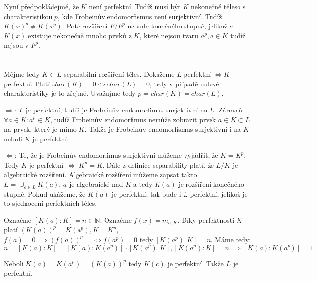 \documentclass[12pt, a4paper]{article}
\begin{document}
Nyní předpokládejmě, že $K$ není perfektní. Tudíž musí být $K$ nekonečné těleso s charakteristikou $p$, kde Frobeinův endomorfismus není surjektivní. Tudíž $K(x)^p \neq K(x^p)$. Poté rozšíření $F/F^p$ nebude konečného stupně, jelikož v $K(x)$ existuje nekonečně mnoho prvků z $K$, které nejsou tvaru $a^p, a \in K$ tudíž nejsou v $F^p$.

\section{}
Mějme tedy $K \subset L$ separabilní rozšíření těles. Dokážeme $L$ perfektní $\iff K$ perfektní. Platí $char(K) = 0 \iff char(L) = 0$, tedy v případě nulové charakteristiky je to zřejmé. Uvažujme tedy $p = char(K) = char(L)$.

$\Rightarrow$: $L$ je perfektní, tudíž je Frobeinův endomorfimus surjektivní na $L$. Zároveň $\forall a \in K: a^p \in K$, tudíž Frobeinův endomorfimus nemůže zobrazit prvek $a \in K \subset L$ na prvek, který je mimo $K$. Takže je Frobeinův endomorfismus surjektivní i na $K$ neboli $K$ je perfektní.

$\Leftarrow$: To, že je Frobeinův endomorfimus surjektivní můžeme vyjádřit, že $K = K^p$. Tedy $K$ je perfektní $\iff$ $K^p = K$. Dále z definice separability platí, že $L/K$ je algebraické rozšíření. Algebraické rozšíření můžeme zapsat takto $L = \cup_{a\in L} K(a)$. $a$ je algebraické nad $K$ a tedy $K(a)$ je rozšíření konečného stupně. Pokud ukážeme, že $K(a)$ je perfektní, tak bude i $L$ perfektní, jelikož je to sjednocení perfektních těles.

Označme $[K(a):K]=n \in \mathbb{N}$. Označme $f(x)=m_{a,K}$. Díky perfektnosti $K$ platí $(K(a))^p = K(a^p), K = K^p$, $f(a)=0 \implies (f(a))^p = \iff f(a^p)=0$ tedy $[K(a^p):K] = n$. Máme tedy:
\[
n=[K(a):K]=[K(a):K(a^p)]\cdot [K(a^p):K], [K(a^p):K] =n \implies [K(a):K(a^p)] = 1
\]

Neboli $K(a)=K(a^p)=(K(a))^p$ tedy $K(a)$ je perfektní. Takže $L$ je perfektní.

\section{}
\end{document}
